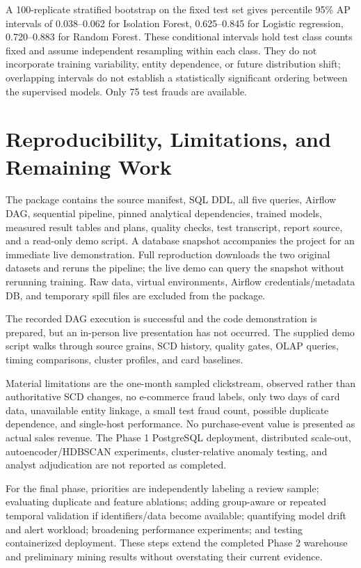 \documentclass[conference]{IEEEtran}
\begin{document}
A 100-replicate stratified bootstrap on the fixed test set gives percentile 95\% AP intervals of 0.038--0.062 for Isolation Forest, 0.625--0.845 for Logistic regression, 0.720--0.883 for Random Forest. These conditional intervals hold test class counts fixed and assume independent resampling within each class. They do not incorporate training variability, entity dependence, or future distribution shift; overlapping intervals do not establish a statistically significant ordering between the supervised models. Only 75 test frauds are available.

\section{Reproducibility, Limitations, and Remaining Work}
The package contains the source manifest, SQL DDL, all five queries, Airflow DAG, sequential pipeline, pinned analytical dependencies, trained models, measured result tables and plans, quality checks, test transcript, report source, and a read-only demo script. A database snapshot accompanies the project for an immediate live demonstration. Full reproduction downloads the two original datasets and reruns the pipeline; the live demo can query the snapshot without rerunning training. Raw data, virtual environments, Airflow credentials/metadata DB, and temporary spill files are excluded from the package.

The recorded DAG execution is successful and the code demonstration is prepared, but an in-person live presentation has not occurred. The supplied demo script walks through source grains, SCD history, quality gates, OLAP queries, timing comparisons, cluster profiles, and card baselines. 

Material limitations are the one-month sampled clickstream, observed rather than authoritative SCD changes, no e-commerce fraud labels, only two days of card data, unavailable entity linkage, a small test fraud count, possible duplicate dependence, and single-host performance. No purchase-event value is presented as actual sales revenue. The Phase 1 PostgreSQL deployment, distributed scale-out, autoencoder/HDBSCAN experiments, cluster-relative anomaly testing, and analyst adjudication are not reported as completed.

For the final phase, priorities are independently labeling a review sample; evaluating duplicate and feature ablations; adding group-aware or repeated temporal validation if identifiers/data become available; quantifying model drift and alert workload; broadening performance experiments; and testing containerized deployment. These steps extend the completed Phase 2 warehouse and preliminary mining results without overstating their current evidence.
\end{document}
